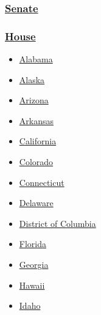 \hypertarget{senate}{%
\subsubsection{\texorpdfstring{\href{https://www.nytimes3xbfgragh.onion/elections/results/senate}{Senate}}{Senate}}\label{senate}}

\hypertarget{house}{%
\subsubsection{\texorpdfstring{\href{https://www.nytimes3xbfgragh.onion/elections/results/house}{House}}{House}}\label{house}}

\begin{itemize}
\tightlist
\item
  \href{https://www.nytimes3xbfgragh.onion/elections/results/alabama}{Alabama}
\item
  \href{https://www.nytimes3xbfgragh.onion/elections/results/alaska}{Alaska}
\item
  \href{https://www.nytimes3xbfgragh.onion/elections/results/arizona}{Arizona}
\item
  \href{https://www.nytimes3xbfgragh.onion/elections/results/arkansas}{Arkansas}
\item
  \href{https://www.nytimes3xbfgragh.onion/elections/results/california}{California}
\item
  \href{https://www.nytimes3xbfgragh.onion/elections/results/colorado}{Colorado}
\item
  \href{https://www.nytimes3xbfgragh.onion/elections/results/connecticut}{Connecticut}
\item
  \href{https://www.nytimes3xbfgragh.onion/elections/results/delaware}{Delaware}
\item
  \href{https://www.nytimes3xbfgragh.onion/elections/results/district-of-columbia}{District
  of Columbia}
\item
  \href{https://www.nytimes3xbfgragh.onion/elections/results/florida}{Florida}
\item
  \href{https://www.nytimes3xbfgragh.onion/elections/results/georgia}{Georgia}
\item
  \href{https://www.nytimes3xbfgragh.onion/elections/results/hawaii}{Hawaii}
\item
  \href{https://www.nytimes3xbfgragh.onion/elections/results/idaho}{Idaho}
\end{itemize}


